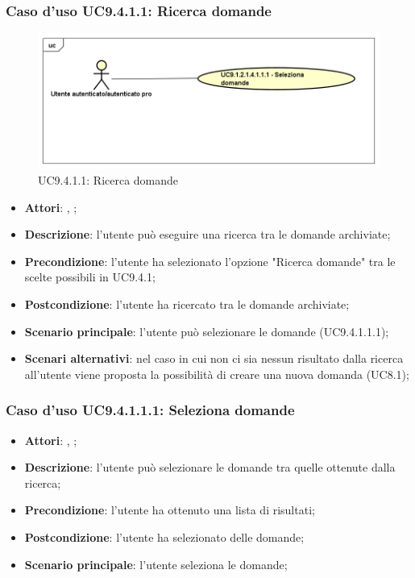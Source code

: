 		 \subsubsection{Caso d'uso UC9.4.1.1: Ricerca domande}
		 \label{UC9.4.1.1}
		 \begin{figure}[h]
		 	\centering
		 	\includegraphics[scale=0.5,keepaspectratio]{UML/UC9_1_2_1_4_1_1.png}
		 	\caption{UC9.4.1.1: Ricerca domande}
		 \end{figure}
		 \FloatBarrier
		 \begin{itemize}
		 	\item \textbf{Attori}: \uau, \uaupro;
		 	\item \textbf{Descrizione}: l'utente può eseguire una ricerca tra le domande archiviate; 
		 	\item \textbf{Precondizione}: l'utente ha selezionato l'opzione "Ricerca domande" tra le scelte possibili in UC9.4.1;
		 	\item \textbf{Postcondizione}: l'utente ha ricercato tra le domande archiviate;
		 	\item \textbf{Scenario principale}: l'utente può selezionare le domande (UC9.4.1.1.1); 
		 	\item \textbf{Scenari alternativi}: nel caso in cui non ci sia nessun risultato dalla ricerca all'utente viene proposta la possibilità di creare una nuova domanda (UC8.1);
		 \end{itemize}
		 
		 \subsubsection{Caso d'uso UC9.4.1.1.1: Seleziona domande}
		 \label{UC9.4.1.1.1}
		 \begin{itemize}
		 	\item \textbf{Attori}: \uau, \uaupro;
		 	\item \textbf{Descrizione}: l'utente può selezionare le domande tra quelle ottenute dalla ricerca;
		 	\item \textbf{Precondizione}: l'utente ha ottenuto una lista di risultati;
		 	\item \textbf{Postcondizione}: l'utente ha selezionato delle domande; 
		 	\item \textbf{Scenario principale}: l'utente seleziona le domande;
		 \end{itemize}
		 
